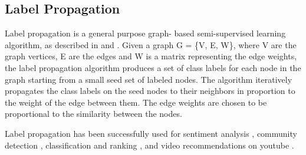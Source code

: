 \subsection{Label Propagation} 

Label propagation is a general purpose graph- based semi-supervised learning
algorithm, as described in \cite{zhu2002learning} and \cite{talukdar:09}.
Given a graph G = \{V, E, W\}, where V are the graph vertices, E are the edges
and W is a matrix representing the edge weights, the label propagation
algorithm produces a set of class labels for each node in the graph starting
from a small seed set of labeled nodes. The algorithm iteratively propagates
the class labels on the seed nodes to their neighbors in proportion to the
weight of the edge between them. The edge weights are chosen to be
proportional to the similarity between the nodes.

\par Label propagation has been successfully used for sentiment analysis
\cite{speriosu2011twitter}, community detection \cite{raghavan2007near},
classification and ranking \cite{talukdar:10}, and video recommendations on
youtube \cite{baluja2008video}.
